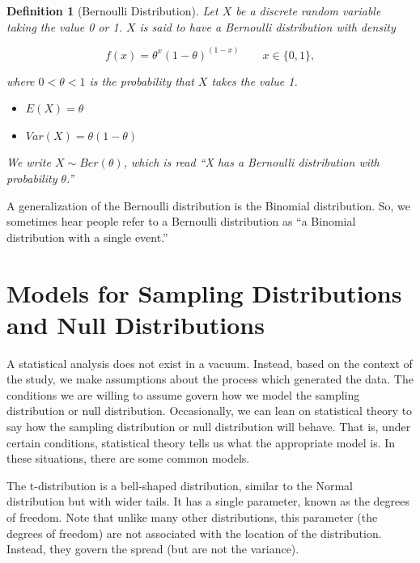 \documentclass[
]{book}
\providecommand{\tightlist}{%
  \setlength{\itemsep}{0pt}\setlength{\parskip}{0pt}}
\theoremstyle{plain}
\theoremstyle{mydefn}
\newtheorem{definition}{Definition}[chapter]
\theoremstyle{myexmpl}
\theoremstyle{remark}
\begin{document}
\begin{definition}[Bernoulli Distribution]
\protect\hypertarget{def:defn-bernoulli-distribution}{}{\label{def:defn-bernoulli-distribution} {} }Let \(X\) be a discrete random variable taking the value 0 or 1. \(X\) is said to have a Bernoulli distribution with density

\[f(x) = \theta^x (1 - \theta)^(1 - x) \qquad x \in \{0, 1\},\]

where \(0 < \theta < 1\) is the probability that \(X\) takes the value 1.

\begin{itemize}
\tightlist
\item
  \(E(X) = \theta\)
\item
  \(Var(X) = \theta(1 - \theta)\)
\end{itemize}

We write \(X \sim Ber(\theta)\), which is read ``X has a Bernoulli distribution with probability \(\theta\).''
\end{definition}

\begin{rmdtip}
A generalization of the Bernoulli distribution is the Binomial distribution. So, we sometimes hear people refer to a Bernoulli distribution as ``a Binomial distribution with a single event.''
\end{rmdtip}

\hypertarget{models-for-sampling-distributions-and-null-distributions}{%
\section{Models for Sampling Distributions and Null Distributions}\label{models-for-sampling-distributions-and-null-distributions}}

A statistical analysis does not exist in a vacuum. Instead, based on the context of the study, we make assumptions about the process which generated the data. The conditions we are willing to assume govern how we model the sampling distribution or null distribution. Occasionally, we can lean on statistical theory to say how the sampling distribution or null distribution will behave. That is, under certain conditions, statistical theory tells us what the appropriate model is. In these situations, there are some common models.

The t-distribution is a bell-shaped distribution, similar to the Normal distribution but with wider tails. It has a single parameter, known as the degrees of freedom. Note that unlike many other distributions, this parameter (the degrees of freedom) are not associated with the location of the distribution. Instead, they govern the spread (but are not the variance).
\end{document}
